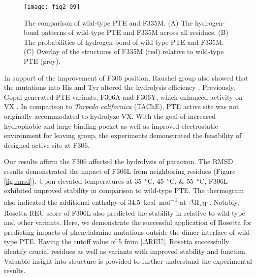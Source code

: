 \begin{refsection}
\begin{figure}[htbp] \centering \texttt{[image: fig2\_09]}
    \caption[The comparison of wild-type PTE and F335M. (A) The hydrogen-bond
    patterns of wild-type PTE and F335M across all residues. (B) The
    probabilities of hydrogen-bond of wild-type PTE and F335M. (C) Overlay of
    the structures of F335M (red) relative to wild-type PTE (grey).] {The
        comparison of wild-type PTE and F335M. (A) The hydrogen-bond patterns
        of wild-type PTE and F335M across all residues. (B) The probabilities
        of hydrogen-bond of wild-type PTE and F335M. (C) Overlay of the
        structures of F335M (red) relative to wild-type PTE (grey). }
        \label{fig:hbond-plot}
\end{figure}

In support of the improvement of F306 position, Raushel group also showed that
the mutations into His and Tyr altered the hydrolysis
efficiency \cite{Pavelka2009}. Previously, Gopal  generated PTE
variants, F306A and F306Y, which enhanced activity on VX \cite{Gopal2000}. In
comparison to \emph{Torpedo californica} (TAChE), PTE active site was not
originally accommodated to hydrolyze VX. With the goal of increased hydrophobic
and large binding pocket as well as improved electrostatic environment for
leaving group, the experiments demonstrated the feasibility of designed active
site at F306.  

Our results affirm the F306 affected the hydrolysis of paraoxon. The RMSD
results demonstrated the impact of F306L from neighboring residues (Figure
\ref{fig:rmsd}). Upon elevated temperatures at \SIlist{35;45;55}{\celsius},
F306L exhibited improved stability in comparison to wild-type PTE. The
thermogram also indicated the additional enthalpy of \SI{34.5}{kcal\per\mole}
at $\Delta$H\textsubscript{vH1}. Notably, Rosetta REU score of F306L also
predicted the stability in relative to wild-type and other variants. Here, we
demonstrate the successful application of Rosetta for predicting impacts of
phenylalanine mutations outside the dimer interface of wild-type PTE. Having
the cutoff value of 5 from |$\Delta$REU|, Rosetta successfully identify crucial
residues as well as variants with improved stability and function. Valuable
insight into structure is provided to further understand the experimental
results. 


\printbibliography[heading=subbibliography]

\end{refsection}
